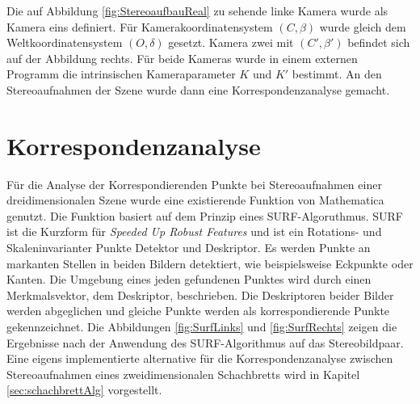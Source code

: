 Die auf Abbildung \ref{fig:StereoaufbauReal} zu sehende linke Kamera wurde als Kamera eins definiert. Für Kamerakoordinatensystem $(C,\beta)$ wurde gleich dem Weltkoordinatensystem $(O,\delta)$ gesetzt. Kamera zwei mit $(C',\beta')$ befindet sich auf der Abbildung rechts. Für beide Kameras wurde in einem externen Programm die intrinsischen Kameraparameter $K$ und $K'$ bestimmt. An den Stereoaufnahmen der Szene wurde dann eine Korrespondenzanalyse gemacht.   

\section{Korrespondenzanalyse}


Für die Analyse der Korrespondierenden Punkte bei Stereoaufnahmen einer dreidimensionalen Szene wurde eine existierende Funktion von Mathematica genutzt\cite{Mathematica}. Die Funktion basiert auf dem Prinzip eines SURF-Algoruthmus. SURF ist die Kurzform für  \textit{Speeded Up Robust Features} und ist ein Rotations- und Skaleninvarianter Punkte Detektor und Deskriptor\cite{SURF,SIFTSURF}. Es werden Punkte an markanten Stellen in beiden Bildern detektiert, wie beispielsweise Eckpunkte oder Kanten. Die Umgebung eines jeden gefundenen Punktes wird durch einen Merkmalsvektor, dem Deskriptor, beschrieben. Die Deskriptoren beider Bilder werden abgeglichen und gleiche Punkte werden als korrespondierende Punkte gekennzeichnet\cite{SURF,SIFTSURF}. Die Abbildungen \ref{fig:SurfLinks} und \ref{fig:SurfRechts} zeigen die Ergebnisse nach der Anwendung des SURF-Algorithmus auf das Stereobildpaar. Eine eigens implementierte alternative für die Korrespondenzanalyse zwischen Stereoaufnahmen eines zweidimensionalen Schachbretts wird in Kapitel \ref{sec:schachbrettAlg} vorgestellt.  


